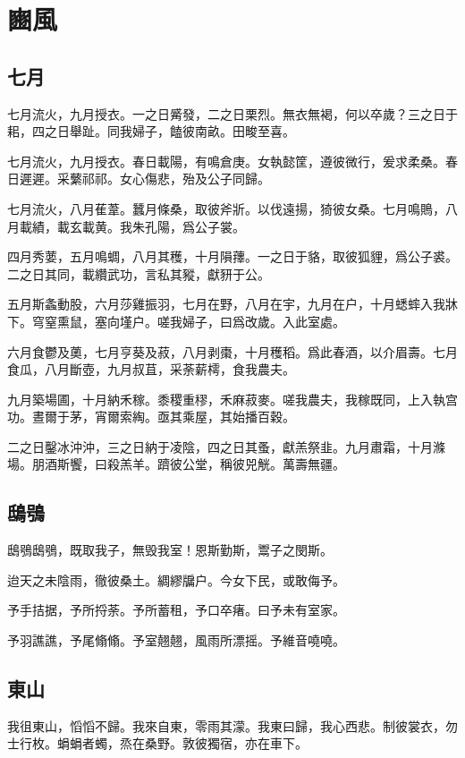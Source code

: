 \section[豳風]{豳風}

\subsection[七月]{七月}

七月流火，九月授衣。一之日觱發，二之日栗烈。無衣無褐，何以卒歲？三之日于耜，四之日舉趾。同我婦子，饁彼南畝。田畯至喜。

七月流火，九月授衣。春日載陽，有鳴倉庚。女執懿筐，遵彼微行，爰求柔桑。春日遲遲。采蘩祁祁。女心傷悲，殆及公子同歸。

七月流火，八月萑葦。蠶月條桑，取彼斧斨。以伐遠揚，猗彼女桑。七月鳴鵙，八月載績，載玄載黄。我朱孔陽，爲公子裳。

四月秀葽，五月鳴蜩，八月其穫，十月隕蘀。一之日于貉，取彼狐貍，爲公子裘。二之日其同，載纘武功，言私其豵，獻豜于公。

五月斯螽動股，六月莎雞振羽，七月在野，八月在宇，九月在户，十月蟋蟀入我牀下。穹窒熏鼠，塞向墐户。嗟我婦子，曰爲改歲。入此室處。

六月食鬱及薁，七月亨葵及菽，八月剥棗，十月穫稻。爲此春酒，以介眉壽。七月食瓜，八月斷壺，九月叔苴，采荼薪樗，食我農夫。

九月築場圃，十月納禾稼。黍稷重穋，禾麻菽麥。嗟我農夫，我稼既同，上入執宫功。晝爾于茅，宵爾索綯。亟其乘屋，其始播百穀。

二之日鑿冰沖沖，三之日納于凌陰，四之日其蚤，獻羔祭韭。九月肅霜，十月滌場。朋酒斯饗，曰殺羔羊。躋彼公堂，稱彼兕觥。萬壽無疆。

\subsection[鴟鴞]{鴟鴞}

鴟鴞鴟鴞，既取我子，無毁我室！恩斯勤斯，鬻子之閔斯。

迨天之未陰雨，徹彼桑土。綢繆牖户。今女下民，或敢侮予。

予手拮据，予所捋荼。予所蓄租，予口卒瘏。曰予未有室家。

予羽譙譙，予尾翛翛。予室翹翹，風雨所漂摇。予維音嘵嘵。

\subsection[東山]{東山}

我徂東山，慆慆不歸。我來自東，零雨其濛。我東曰歸，我心西悲。制彼裳衣，勿士行枚。蜎蜎者蠋，烝在桑野。敦彼獨宿，亦在車下。

